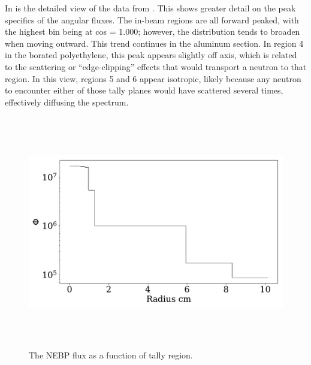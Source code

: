 In  is the detailed view of the data from .
This shows greater detail on the peak specifics of the angular fluxes.
The in-beam regions are all forward peaked, with the highest bin being at cos = 1.000; however, the distribution tends to broaden when moving outward.
This trend continues in the aluminum section.
In region 4 in the borated polyethylene, this peak appears slightly off axis, which is related to the scattering or ``edge-clipping'' effects that would transport a neutron to that region.
In this view, regions 5 and 6 appear isotropic, likely because any neutron to encounter either of those tally planes would have scattered several times, effectively diffusing the spectrum.


\begin{figure}[htb]
\centering
\includegraphics[height=4in]{tex/figures/flux_rad.pdf}
\caption[Regional Flux]{The NEBP flux as a function of tally region.}
\label{fig:flux_rad}
\end{figure}

